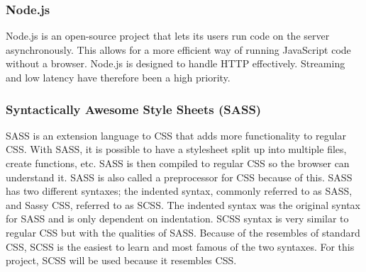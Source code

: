 


\subsubsection{Node.js}%
\label{ssub:Node}
Node.js is an open-source project that lets its users run code on the server asynchronously. This allows for a more efficient way of running JavaScript code without a browser. Node.js is designed to handle HTTP effectively. Streaming and low latency have therefore been a high priority. 


\subsubsection{Syntactically Awesome Style Sheets (SASS)}%
\label{sub:sass}
SASS is an extension language to CSS that adds more functionality to regular CSS. With SASS, it is possible to have a stylesheet split up into multiple files, create functions, etc. SASS is then compiled to regular CSS so the browser can understand it. SASS is also called a preprocessor for CSS because of this. SASS has two different syntaxes; the indented syntax, commonly referred to as SASS, and Sassy CSS, referred to as SCSS. The indented syntax was the original syntax for SASS and is only dependent on indentation. SCSS syntax is very similar to regular CSS but with the qualities of SASS. Because of the resembles of standard CSS, SCSS is the easiest to learn and most famous of the two syntaxes. For this project, SCSS will be used because it resembles CSS. 

